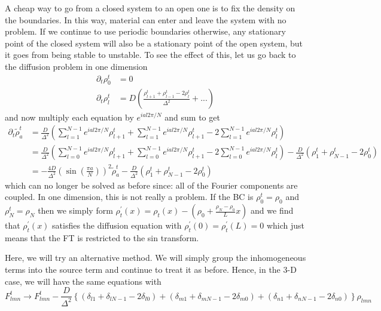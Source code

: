 \documentclass[aps,preprint]{revtex4-1}%
\begin{document}
A cheap way to go from a closed system to an open one is to fix the density on
the boundaries. In this way, material can enter and leave the system with no
problem. If we continue to use periodic boundaries otherwise, any stationary
point of the closed system will also be a stationary point of the open system,
but it goes from being stable to unstable. To see the effect of this, let us
go back to the diffusion problem in one dimension%
\begin{align}
\partial_{t}\rho_{0}^{t}  & =0\\
\partial_{t}\rho_{l}^{t}  & =D\left(  \frac{\rho_{l+1}^{t}+\rho_{l-1}%
^{t}-2\rho_{l}^{t}}{\Delta^{2}}+...\right)  \nonumber
\end{align}
and now multiply each equation by $e^{ial2\pi/N}$ and sum to get%
\begin{align*}
\partial_{t}\widetilde{\rho}_{a}^{t}  & =\frac{D}{\Delta^{2}}\left(
\sum_{l=1}^{N-1}e^{ial2\pi/N}\rho_{l+1}^{t}+\sum_{l=1}^{N-1}e^{ial2\pi/N}%
\rho_{l+1}^{t}-2\sum_{l=1}^{N-1}e^{ial2\pi/N}\rho_{l}^{t}\right)  \\
& =\frac{D}{\Delta^{2}}\left(  \sum_{l=0}^{N-1}e^{ial2\pi/N}\rho_{l+1}%
^{t}+\sum_{l=0}^{N-1}e^{ial2\pi/N}\rho_{l+1}^{t}-2\sum_{l=0}^{N-1}%
e^{ial2\pi/N}\rho_{l}^{t}\right)  -\frac{D}{\Delta^{2}}\left(  \rho_{1}%
^{t}+\rho_{N-1}^{t}-2\rho_{0}^{t}\right)  \\
& =-\frac{4D}{\Delta^{2}}\left(  \sin\left(  \frac{\pi a}{N}\right)  \right)
^{2}\widetilde{\rho}_{a}^{t}-\frac{D}{\Delta^{2}}\left(  \rho_{1}^{t}%
+\rho_{N-1}^{t}-2\rho_{0}^{t}\right)
\end{align*}
which can no longer be solved as before since: all of the Fourier components
are coupled. In one dimension, this is not really a problem. If the BC is
$\rho_{0}^{t}=\rho_{0}$ and $\rho_{N}^{t}=\rho_{N}$ then we simply form
$\rho_{t}^{\prime}\left(  x\right)  =\rho_{t}\left(  x\right)  -\left(
\rho_{0}+\frac{\rho_{N}-\rho_{0}}{L}x\right)  $ and we find that $\rho
_{t}^{\prime}\left(  x\right)  $ satisfies the diffusion equation with
$\rho_{t}^{\prime}\left(  0\right)  =\rho_{t}^{\prime}\left(  L\right)  =0$
which just means that the FT is restricted to the sin transform. 

Here, we will try an alternative method. We will simply group the
inhomogeneous terms into the source term and continue to treat it as before.
Hence, in the 3-D case, we will have the same equations with
\[
F_{lmn}^{t}\rightarrow F_{lmn}^{t}-\frac{D}{\Delta^{2}}\left\{  \left(
\delta_{l1}+\delta_{lN-1}-2\delta_{l0}\right)  +\left(  \delta_{m1}%
+\delta_{mN-1}-2\delta_{m0}\right)  +\left(  \delta_{n1}+\delta_{nN-1}%
-2\delta_{n0}\right)  \right\}  \rho_{lmn}%
\]
\end{document}
